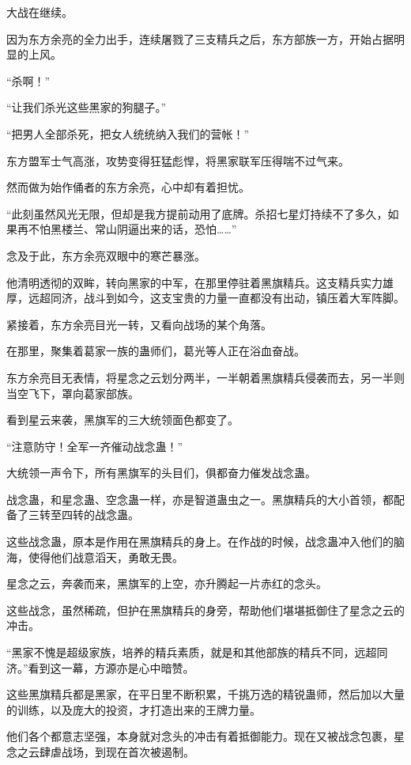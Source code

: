
\begin{this_body}

大战在继续。

因为东方余亮的全力出手，连续屠戮了三支精兵之后，东方部族一方，开始占据明显的上风。

“杀啊！”

“让我们杀光这些黑家的狗腿子。”

“把男人全部杀死，把女人统统纳入我们的营帐！”

东方盟军士气高涨，攻势变得狂猛彪悍，将黑家联军压得喘不过气来。

然而做为始作俑者的东方余亮，心中却有着担忧。

“此刻虽然风光无限，但却是我方提前动用了底牌。杀招七星灯持续不了多久，如果再不怕黑楼兰、常山阴逼出来的话，恐怕……”

念及于此，东方余亮双眼中的寒芒暴涨。

他清明透彻的双眸，转向黑家的中军，在那里停驻着黑旗精兵。这支精兵实力雄厚，远超同济，战斗到如今，这支宝贵的力量一直都没有出动，镇压着大军阵脚。

紧接着，东方余亮目光一转，又看向战场的某个角落。

在那里，聚集着葛家一族的蛊师们，葛光等人正在浴血奋战。

东方余亮目无表情，将星念之云划分两半，一半朝着黑旗精兵侵袭而去，另一半则当空飞下，罩向葛家部族。

看到星云来袭，黑旗军的三大统领面色都变了。

“注意防守！全军一齐催动战念蛊！”

大统领一声令下，所有黑旗军的头目们，俱都奋力催发战念蛊。

战念蛊，和星念蛊、空念蛊一样，亦是智道蛊虫之一。黑旗精兵的大小首领，都配备了三转至四转的战念蛊。

这些战念蛊，原本是作用在黑旗精兵的身上。在作战的时候，战念蛊冲入他们的脑海，使得他们战意滔天，勇敢无畏。

星念之云，奔袭而来，黑旗军的上空，亦升腾起一片赤红的念头。

这些战念，虽然稀疏，但护在黑旗精兵的身旁，帮助他们堪堪抵御住了星念之云的冲击。

“黑家不愧是超级家族，培养的精兵素质，就是和其他部族的精兵不同，远超同济。”看到这一幕，方源亦是心中暗赞。

这些黑旗精兵都是黑家，在平日里不断积累，千挑万选的精锐蛊师，然后加以大量的训练，以及庞大的投资，才打造出来的王牌力量。

他们各个都意志坚强，本身就对念头的冲击有着抵御能力。现在又被战念包裹，星念之云肆虐战场，到现在首次被遏制。


\end{this_body}
